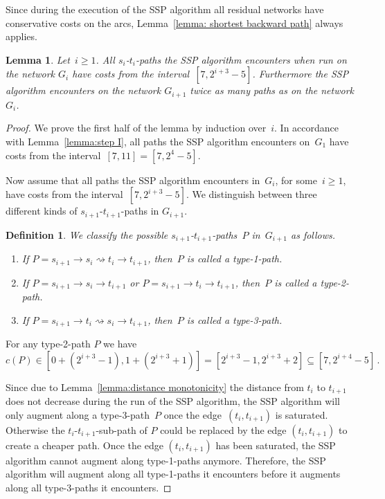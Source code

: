 \documentclass[11pt]{article}
\newtheorem{lemma}[theorem]{Lemma}
\newtheorem{definition}[theorem]{Definition}
\newcommand{\DOT}{\,.}
\newcommand{\PATH}[1][]{\stackrel{#1}{\rightsquigarrow}}
\begin{document}
Since during the execution of the SSP algorithm all residual networks have conservative costs on the arcs, Lemma~\ref{lemma: shortest backward path} always applies.
\begin{lemma}\label{lemma:CostsGi}
Let~$i\ge 1$.
All $s_i$-$t_i$-paths the SSP algorithm encounters when run on the network $G_i$ have costs from the interval~$[7, 2^{i+3}-5]$.
Furthermore the SSP algorithm encounters on  the network $G_{i+1}$ twice as many paths as on the network $G_{i}$.
\end{lemma}
\begin{proof}
We prove the first half of the lemma by induction over~$i$.
In accordance with Lemma~\ref{lemma:step I}, all paths the SSP algorithm encounters on~$G_1$ have costs from the interval~$[7,11] = [7,2^4-5]$.

Now assume that all paths the SSP algorithm encounters in~$G_{i}$, for some~$i\ge 1$, have costs from the interval~$[7, 2^{i+3}-5]$.
We distinguish between three different kinds of $s_{i+1}$-$t_{i+1}$-paths in $G_{i+1}$.
\begin{definition}
We classify the possible $s_{i+1}$-$t_{i+1}$-paths~$P$ in~$G_{i+1}$ as follows.
\begin{enumerate}\setlength{\itemsep}{0em}
  \item If $P = s_{i+1} \to s_i \PATH t_i \to t_{i+1}$, then~$P$ is called a \emph{type-1-path}.
  \item If $P = s_{i+1} \to s_i \to t_{i+1}$ or $P = s_{i+1} \to t_i \to t_{i+1}$, then~$P$ is called a \emph{type-2-path}.
  \item If $P = s_{i+1} \to t_i \PATH s_i \to t_{i+1}$, then~$P$ is called a \emph{type-3-path}.
\end{enumerate}
\end{definition}
For any type-2-path $P$ we have 
\[
  c(P) \in [0 + (2^{i+3} - 1), 1+ (2^{i+3} + 1)] = [2^{i+3} - 1, 2^{i+3} + 2]
  \subseteq [7, 2^{i+4}-5]\DOT
\]

Since due to Lemma~\ref{lemma:distance monotonicity} the distance from $t_{i}$
to $t_{i+1}$ does not decrease during the run of the SSP algorithm, the SSP
algorithm will only augment along a type-3-path~$P$ once the
edge~$(t_{i},t_{i+1})$ is saturated. Otherwise the
$t_{i}$-$t_{i+1}$-sub-path of $P$ could be replaced by the edge $(t_{i},t_{i+1})$
to create a cheaper path. Once the edge $(t_{i},t_{i+1})$ has been saturated,
the SSP algorithm cannot augment along type-1-paths anymore.
Therefore, the SSP algorithm will augment along all type-1-paths it encounters
before it augments along all type-3-paths it encounters.
 

\end{proof}
\end{document}
